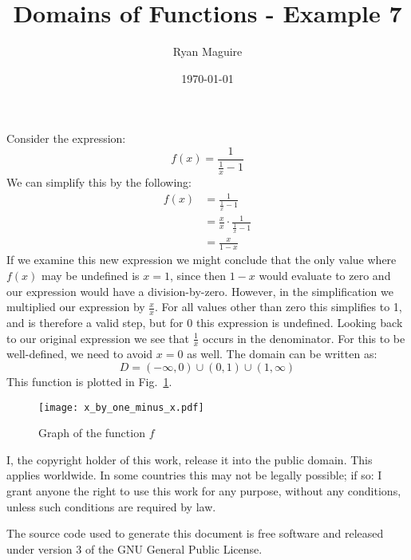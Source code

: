 \documentclass{article}
\title{Domains of Functions - Example 7}
\author{Ryan Maguire}
\date{\today}
\begin{document}
    \maketitle
    Consider the expression:
    \begin{equation}
        f(x)=\frac{1}{\frac{1}{x}-1}
    \end{equation}
    We can simplify this by the following:
    \begin{align}
        f(x)&=\frac{1}{\frac{1}{x}-1}\\
            &=\frac{x}{x}\cdot\frac{1}{\frac{1}{x}-1}\\
            &=\frac{x}{1-x}
    \end{align}
    If we examine this new expression we might conclude that the only value
    where $f(x)$ may be undefined is $x=1$, since then $1-x$ would evaluate to
    zero and our expression would have a division-by-zero. However, in the
    simplification we multiplied our expression by $\frac{x}{x}$. For all
    values other than zero this simplifies to 1, and is therefore a valid
    step, but for 0 this expression is undefined. Looking back to our original
    expression we see that $\frac{1}{x}$ occurs in the denominator. For this
    to be well-defined, we need to avoid $x=0$ as well. The domain can be
    written as:
    \begin{equation}
        D=(-\infty, 0)\cup(0,1)\cup(1,\infty)
    \end{equation}
    This function is plotted in Fig.~\ref{fig:graph_of_func}.
    \begin{figure}
        \centering
        \texttt{[image: x\_by\_one\_minus\_x.pdf]}
        \caption{Graph of the function $f$}
        \label{fig:graph_of_func}
    \end{figure}
    \newpage
    I, the copyright holder of this work, release it into the public domain.
    This applies worldwide. In some countries this may not be legally possible;
    if so: I grant anyone the right to use this work for any purpose, without
    any conditions, unless such conditions are required by law.
    \par\hfill\par
    The source code used to generate this document is free software and released
    under version 3 of the GNU General Public License.
\end{document}
